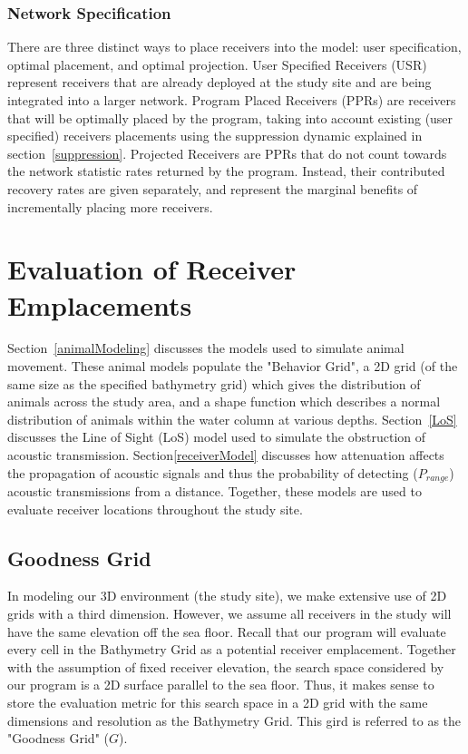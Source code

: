 \subsubsection{Network Specification}
There are three distinct ways to place receivers into the model: user specification, optimal placement, and optimal projection.  User Specified Receivers (USR) represent receivers that are already deployed at the study site and are being integrated into a larger network.    Program Placed Receivers (PPRs) are receivers that will be  optimally placed by the program, taking into account existing (user specified) receivers placements using the suppression dynamic explained in section~\ref{suppression}.  Projected Receivers are PPRs that do not count towards the network statistic rates returned by the program.  Instead, their contributed recovery rates are given separately, and represent the marginal benefits of incrementally placing more receivers.  


\section{Evaluation of Receiver Emplacements}
\label{evaluationOfReceierEmplacements}
Section~\ref{animalModeling} discusses the models used to simulate animal movement.  These animal models populate the "Behavior Grid", a 2D grid (of the same size as the specified bathymetry grid) which gives the distribution of animals across the study area, and a shape function which describes a normal distribution of animals within the water column at various depths.  Section~\ref{LoS} discusses the Line of Sight (LoS) model used to simulate the obstruction of acoustic transmission.  Section\ref{receiverModel} discusses how attenuation affects the propagation of acoustic signals and thus the probability of detecting ($P_{range}$) acoustic transmissions from a distance.  Together, these models are used to evaluate receiver locations throughout the study site.  


\subsection{Goodness Grid}
\label{GoodnessGrid}
In modeling our 3D environment (the study site), we make extensive use of 2D grids with a third dimension.  However, we assume all receivers in the study will have the same elevation off the sea floor.  Recall that our program will evaluate every cell in the Bathymetry Grid as a potential receiver emplacement.  Together with the assumption of fixed receiver elevation, the search space considered by our program is a 2D surface parallel to the sea floor.  Thus, it makes sense to store the evaluation metric for this search space in a 2D grid with the same dimensions and resolution as the Bathymetry Grid.  This gird is referred to as the "Goodness Grid" ($G$).  

